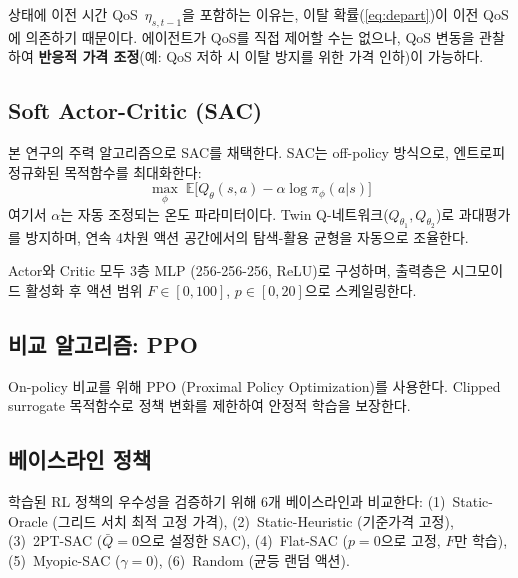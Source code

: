 \documentclass[10pt, twocolumn]{article}
\begin{document}
상태에 이전 시간 QoS~$\eta_{s,t-1}$을 포함하는 이유는, 이탈 확률(\ref{eq:depart})이 이전 QoS에 의존하기 때문이다\cite{ahn2006}.
에이전트가 QoS를 직접 제어할 수는 없으나, QoS 변동을 관찰하여 \textbf{반응적 가격 조정}(예: QoS 저하 시 이탈 방지를 위한 가격 인하)이 가능하다.

\subsection{Soft Actor-Critic (SAC)}

본 연구의 주력 알고리즘으로 SAC\cite{haarnoja2018}를 채택한다.
SAC는 off-policy 방식으로, 엔트로피 정규화된 목적함수를 최대화한다:
\begin{equation}
  \max_\phi \;\mathbb{E}\!\Big[Q_\theta(s, a) - \alpha \log \pi_\phi(a|s)\Big]
  \label{eq:sac}
\end{equation}
여기서 $\alpha$는 자동 조정되는 온도 파라미터이다.
Twin Q-네트워크($Q_{\theta_1}, Q_{\theta_2}$)로 과대평가를 방지하며, 연속 4차원 액션 공간에서의 탐색-활용 균형을 자동으로 조율한다.

Actor와 Critic 모두 3층 MLP (256-256-256, ReLU)로 구성하며, 출력층은 시그모이드 활성화 후 액션 범위 $F \in [0, 100]$, $p \in [0, 20]$으로 스케일링한다.

\subsection{비교 알고리즘: PPO}

On-policy 비교를 위해 PPO (Proximal Policy Optimization)를 사용한다.
Clipped surrogate 목적함수로 정책 변화를 제한하여 안정적 학습을 보장한다.

\subsection{베이스라인 정책}

학습된 RL 정책의 우수성을 검증하기 위해 6개 베이스라인과 비교한다:
(1)~Static-Oracle (그리드 서치 최적 고정 가격),
(2)~Static-Heuristic (기준가격 고정),
(3)~2PT-SAC ($\bar{Q}=0$으로 설정한 SAC),
(4)~Flat-SAC ($p=0$으로 고정, $F$만 학습),
(5)~Myopic-SAC ($\gamma=0$),
(6)~Random (균등 랜덤 액션).
\end{document}
